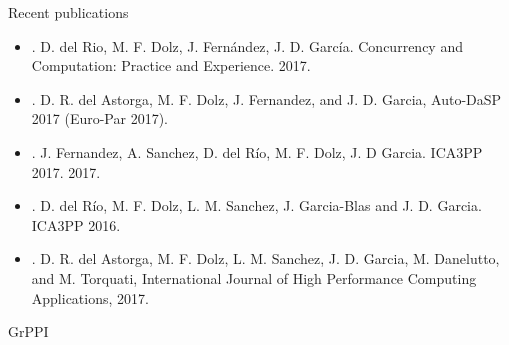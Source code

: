 \begin{frame}[t]{Recent publications}
\begin{scriptsize}
\begin{itemize}
\item
{}. 
D. del Rio, M. F. Dolz, J. Fernández, J. D. García. 
Concurrency and Computation: Practice and Experience. 
2017.
\vfill
\item
{}.
D. R. del Astorga, M. F. Dolz, J. Fernandez, and J. D. Garcia, 
Auto-DaSP 2017 (Euro-Par 2017).
\item
{}.
J. Fernandez, A. Sanchez, D. del Río, M. F. Dolz, J. D Garcia.
ICA3PP 2017.
2017.
\item
{}. 
D. del Río, M. F. Dolz, L. M. Sanchez, J. Garcia-Blas and J. D. Garcia. 
ICA3PP 2016.
\item
{}.
D. R. del Astorga, M. F. Dolz, L. M. Sanchez, J. D. Garcia, M. Danelutto, and M. Torquati, 
International Journal of High Performance Computing Applications, 2017.
\end{itemize}
\end{scriptsize}
\end{frame}

\begin{frame}{GrPPI}
\begin{Large}
\end{Large}
\end{frame}
